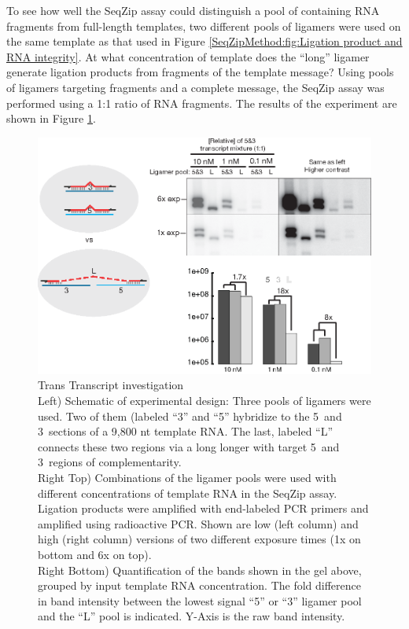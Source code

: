     To see how well the SeqZip assay could distinguish a pool of containing RNA fragments from full-length templates, two different pools of ligamers were used on the same template as that used in Figure \ref{SeqZipMethod:fig:Ligation product and RNA integrity}. At what concentration of template does the ``long'' ligamer generate ligation products from fragments of the template message? Using pools of ligamers targeting fragments and a complete message, the SeqZip assay was performed using a 1:1 ratio of RNA fragments. The results of the experiment are shown in Figure \ref{SeqZipMethod:fig: trans Tx for degradation}.

  	\begin{figure} %
    	\centering 
    	\includegraphics{Figures/SeqZipMethod/TransRNAWithSeqZip.eps}
    	\caption[Trans Transcript investigation]
    	{
	      Trans Transcript investigation\\[0.25cm]
  	    Left) Schematic of experimental design: Three pools of ligamers were used. Two of them (labeled ``3'' and ``5'' hybridize to the 5\textprime~and 3\textprime~sections of a 9,800 nt template RNA. The last, labeled ``L'' connects these two regions via a long longer with target 5\textprime~and 3\textprime~regions of complementarity. \\
        Right Top) Combinations of the ligamer pools were used with different concentrations of template RNA in the SeqZip assay. Ligation products were amplified with end-labeled PCR primers and amplified using radioactive PCR. Shown are low (left column) and high (right column) versions of two different exposure times (1x on bottom and 6x on top). \\
        Right Bottom) Quantification of the bands shown in the gel above, grouped by input template RNA concentration. The fold difference in band intensity between the lowest signal ``5'' or ``3'' ligamer pool and the ``L'' pool is indicated. Y-Axis is the raw band intensity.
		    }
   	 \label{SeqZipMethod:fig: trans Tx for degradation}
	 	 \end{figure}

